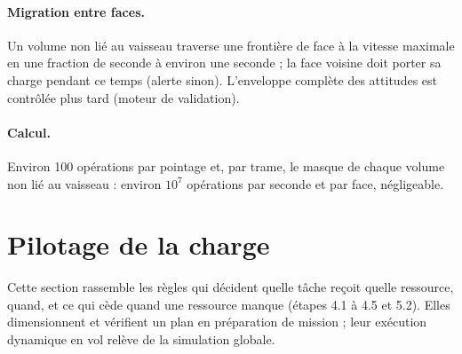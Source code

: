 \documentclass[11pt,a4paper]{article}
\begin{document}
\paragraph{Migration entre faces.} Un volume non lié au vaisseau traverse une frontière de face à la vitesse maximale
en une fraction de seconde à environ une seconde ; la face voisine doit porter sa charge pendant ce temps (alerte
sinon). L'enveloppe complète des attitudes est contrôlée plus tard (moteur de validation).

\paragraph{Calcul.} Environ 100 opérations par pointage et, par trame, le masque de chaque volume non lié au vaisseau :
environ $10^7$ opérations par seconde et par face, négligeable.

\section{Pilotage de la charge}\label{sec:load}
Cette section rassemble les règles qui décident quelle tâche reçoit quelle ressource, quand, et ce qui cède quand une
ressource manque (étapes 4.1 à 4.5 et 5.2). Elles dimensionnent et vérifient un plan en préparation de mission ; leur
exécution dynamique en vol relève de la simulation globale.
\end{document}

